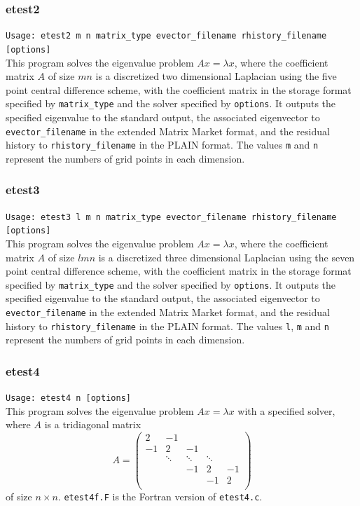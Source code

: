 \documentclass[a4paper]{article}
\begin{document}
\subsubsection{etest2}

\verb+Usage: etest2 m n matrix_type evector_filename rhistory_filename [options]+\\

This program solves the eigenvalue problem $Ax = \lambda x$, where the 
coefficient matrix $A$ of size $mn$ is a discretized two dimensional Laplacian using the five
point central difference scheme, with the coefficient matrix in the storage format specified
by \verb|matrix_type| and the solver specified by {\tt options}. 
It outputs the specified eigenvalue to the standard output, 
the associated eigenvector to {\tt evector\_filename} in the
extended Matrix Market format, and 
the residual history to {\tt rhistory\_filename} 
in the PLAIN format. 
The values {\tt m} and {\tt n} represent the numbers of grid points
in each dimension. 

\subsubsection{etest3}

\verb+Usage: etest3 l m n matrix_type evector_filename rhistory_filename [options]+\\

This program solves the eigenvalue problem $Ax = \lambda x$, where the 
coefficient matrix $A$ of size $lmn$ is a discretized three dimensional Laplacian using the seven
point central difference scheme, with the coefficient matrix in the storage format specified
by \verb|matrix_type| and the solver specified by {\tt options}. 
It outputs the specified eigenvalue to the standard output, 
the associated eigenvector to {\tt evector\_filename} in the
extended Matrix Market format, and
the residual history to {\tt rhistory\_filename} 
in the PLAIN format. 
The values {\tt l}, {\tt m} and {\tt n} represent the numbers of grid
points in each dimension. 

\subsubsection{etest4}

\verb+Usage: etest4 n [options]+\\

This program solves the eigenvalue problem $Ax = \lambda x$ with a specified 
solver, where $A$ is a tridiagonal matrix
\[
A = 
\left(
\begin{array}{ccccc}
2 & -1 &   &  &   \\
-1 & 2 & -1 &  &   \\
  & \ddots  & \ddots  & \ddots  &   \\
  &   & -1 & 2 & -1 \\
  &   &   & -1 & 2 \\
\end{array}
\right)
\]
of size $n \times n$.
{\tt etest4f.F} is the Fortran version of {\tt etest4.c}.
\end{document}
